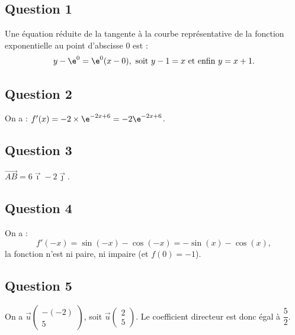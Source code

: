 \subsection*{Question 1}

Une équation réduite de la tangente à la courbe représentative de la fonction exponentielle au point d'abscisse 0 est :
\[
y - \e^0 = \e^0(x - 0), \text{ soit } y - 1 = x \text{ et enfin } y = x + 1.
\]

\subsection*{Question 2}

On a : \( f'(x) = -2 \times \e^{-2x + 6} = -2 \e^{-2x + 6} \).

\subsection*{Question 3}

\(\overrightarrow{AB} = 6\vec{\imath} - 2\vec{\jmath}\).

\subsection*{Question 4}

On a :
\[
f'(-x) = \sin(-x) - \cos(-x) = -\sin(x) - \cos(x),
\]
la fonction n'est ni paire, ni impaire (et \( f(0) = -1 \)).

\subsection*{Question 5}

On a \(\vec{u} \begin{pmatrix} -(-2) \\ 5 \end{pmatrix}\), soit \(\vec{u} \begin{pmatrix} 2 \\ 5 \end{pmatrix}\).
Le coefficient directeur est donc égal à \( \dfrac{5}{2} \).
